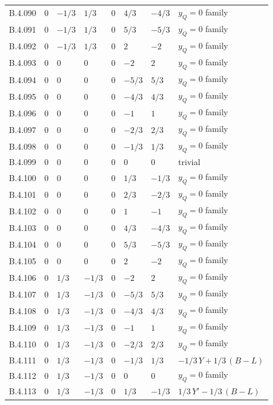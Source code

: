 {\begin{longtable}{@{}lllllll>{\raggedright\arraybackslash}p{5.6cm}@{}}
B.4.090 & $0$ & $-1/3$ & $1/3$ & $0$ & $4/3$ & $-4/3$ & $y_Q=0$ family \\
B.4.091 & $0$ & $-1/3$ & $1/3$ & $0$ & $5/3$ & $-5/3$ & $y_Q=0$ family \\
B.4.092 & $0$ & $-1/3$ & $1/3$ & $0$ & $2$ & $-2$ & $y_Q=0$ family \\
B.4.093 & $0$ & $0$ & $0$ & $0$ & $-2$ & $2$ & $y_Q=0$ family \\
B.4.094 & $0$ & $0$ & $0$ & $0$ & $-5/3$ & $5/3$ & $y_Q=0$ family \\
B.4.095 & $0$ & $0$ & $0$ & $0$ & $-4/3$ & $4/3$ & $y_Q=0$ family \\
B.4.096 & $0$ & $0$ & $0$ & $0$ & $-1$ & $1$ & $y_Q=0$ family \\
B.4.097 & $0$ & $0$ & $0$ & $0$ & $-2/3$ & $2/3$ & $y_Q=0$ family \\
B.4.098 & $0$ & $0$ & $0$ & $0$ & $-1/3$ & $1/3$ & $y_Q=0$ family \\
B.4.099 & $0$ & $0$ & $0$ & $0$ & $0$ & $0$ & trivial \\
B.4.100 & $0$ & $0$ & $0$ & $0$ & $1/3$ & $-1/3$ & $y_Q=0$ family \\
B.4.101 & $0$ & $0$ & $0$ & $0$ & $2/3$ & $-2/3$ & $y_Q=0$ family \\
B.4.102 & $0$ & $0$ & $0$ & $0$ & $1$ & $-1$ & $y_Q=0$ family \\
B.4.103 & $0$ & $0$ & $0$ & $0$ & $4/3$ & $-4/3$ & $y_Q=0$ family \\
B.4.104 & $0$ & $0$ & $0$ & $0$ & $5/3$ & $-5/3$ & $y_Q=0$ family \\
B.4.105 & $0$ & $0$ & $0$ & $0$ & $2$ & $-2$ & $y_Q=0$ family \\
B.4.106 & $0$ & $1/3$ & $-1/3$ & $0$ & $-2$ & $2$ & $y_Q=0$ family \\
B.4.107 & $0$ & $1/3$ & $-1/3$ & $0$ & $-5/3$ & $5/3$ & $y_Q=0$ family \\
B.4.108 & $0$ & $1/3$ & $-1/3$ & $0$ & $-4/3$ & $4/3$ & $y_Q=0$ family \\
B.4.109 & $0$ & $1/3$ & $-1/3$ & $0$ & $-1$ & $1$ & $y_Q=0$ family \\
B.4.110 & $0$ & $1/3$ & $-1/3$ & $0$ & $-2/3$ & $2/3$ & $y_Q=0$ family \\
B.4.111 & $0$ & $1/3$ & $-1/3$ & $0$ & $-1/3$ & $1/3$ & $-1/3\,Y+1/3\,(B{-}L)$ \\
B.4.112 & $0$ & $1/3$ & $-1/3$ & $0$ & $0$ & $0$ & $y_Q=0$ family \\
B.4.113 & $0$ & $1/3$ & $-1/3$ & $0$ & $1/3$ & $-1/3$ & $1/3\,Y'-1/3\,(B{-}L)$ \\

\end{longtable}}
